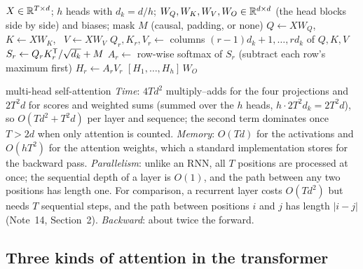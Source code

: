 \documentclass[11pt]{article}
\begin{document}
\begin{algorithm}[htbp]
\caption{Multi-head (masked) self-attention, forward pass}\label{alg:mha}
\begin{algorithmic}[1]
\Require $X \in \mathbb{R}^{T \times d}$; $h$ heads with $d_k = d/h$; $W_Q, W_K, W_V, W_O \in \mathbb{R}^{d \times d}$ (the head blocks side by
  side) and biases; mask $M$ (causal, padding, or none)
  \State $Q \gets XW_Q$, \ $K \gets XW_K$, \ $V \gets XW_V$ 
   
    \State $Q_r, K_r, V_r \gets$ columns $(r - 1)d_k + 1, \dots, rd_k$ of $Q, K, V$
    \State $S_r \gets Q_rK_r^{\mathsf{T}}/\sqrt{d_k} + M$ 
    \State $A_r \gets$ row-wise softmax of $S_r$ (subtract each row's maximum first)
    \State $H_r \gets A_rV_r$ 
  \EndFor
  \State \Return $[H_1, \dots, H_h]\,W_O$ 
\EndFunction
\end{algorithmic}
\end{algorithm}

\begin{runtime}{multi-head self-attention}
\emph{Time}: $4Td^2$ multiply--adds for the four projections and $2T^2d$ for scores and weighted sums (summed over the
$h$ heads, $h \cdot 2T^2d_k = 2T^2d$), so $O(Td^2 + T^2d)$ per layer and sequence; the second term dominates once $T > 2d$
when only attention is counted. \emph{Memory}: $O(Td)$ for the activations and $O(hT^2)$ for the attention weights, which a
standard implementation stores for the backward pass. \emph{Parallelism}: unlike an RNN, all $T$ positions are processed at
once; the sequential depth of a layer is $O(1)$, and the path between any two positions has length one. For comparison, a
recurrent layer costs $O(Td^2)$ but needs $T$ sequential steps, and the path between positions $i$ and $j$ has length
$|i - j|$ (Note~14, Section~2). \emph{Backward}: about twice the forward.
\end{runtime}

\subsection{Three kinds of attention in the transformer}\label{sec:threekinds}
\end{document}
